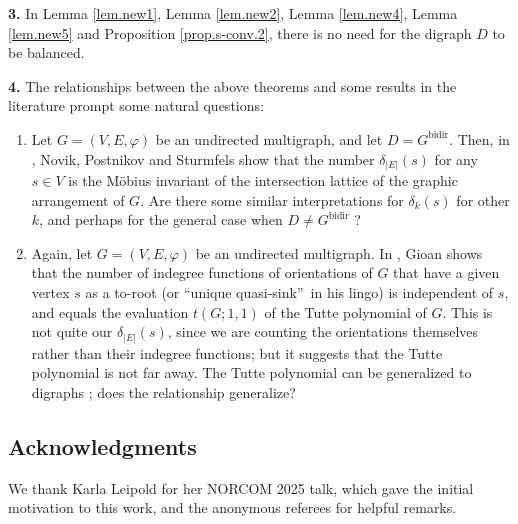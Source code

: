 \documentclass[numbers=enddot,12pt,final,onecolumn,notitlepage]{scrartcl}%
\theoremstyle{definition}
\theoremstyle{plainsl}
\begin{document}
\bigskip

\textbf{3.} In Lemma \ref{lem.new1}, Lemma \ref{lem.new2}, Lemma
\ref{lem.new4}, Lemma \ref{lem.new5} and Proposition \ref{prop.s-conv.2},
there is no need for the digraph $D$ to be balanced.

\bigskip

\textbf{4.} The relationships between the above theorems and some results in
the literature prompt some natural questions:

\begin{enumerate}
\item[\textbf{(a)}] Let $G=\left(  V,E,\varphi\right)  $ be an undirected
multigraph, and let $D=G^{\operatorname*{bidir}}$. Then, in \cite[Proposition
5.3]{NoPoSt02}, Novik, Postnikov and Sturmfels show that the number
$\delta_{\left\vert E\right\vert }\left(  s\right)  $ for any $s\in V$ is the
M\"{o}bius invariant of the intersection lattice of the graphic arrangement of
$G$. Are there some similar interpretations for $\delta_{k}\left(  s\right)  $
for other $k$, and perhaps for the general case when $D\neq
G^{\operatorname*{bidir}}$ ?

\item[\textbf{(b)}] Again, let $G=\left(  V,E,\varphi\right)  $ be an
undirected multigraph. In \cite[Theorem 3.4]{Gioan07}, Gioan shows that the
number of indegree functions of orientations of $G$ that have a given vertex
$s$ as a to-root (or \textquotedblleft unique quasi-sink\textquotedblright\ in
his lingo) is independent of $s$, and equals the evaluation $t\left(
G;1,1\right)  $ of the Tutte polynomial of $G$. This is not quite our
$\delta_{\left\vert E\right\vert }\left(  s\right)  $, since we are counting
the orientations themselves rather than their indegree functions; but it
suggests that the Tutte polynomial is not far away. The Tutte polynomial can be
generalized to digraphs \cite{AwaBer18}; does the relationship generalize?
\end{enumerate}

\subsection*{Acknowledgments}

We thank Karla Leipold for her NORCOM 2025 talk, which gave
the initial motivation to this work, and
the anonymous referees for helpful remarks.
\end{document}
